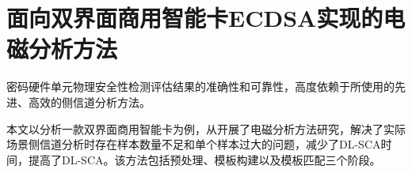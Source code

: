 \chapter{面向双界面商用智能卡ECDSA实现的电磁分析方法}\label{chap:search2}{
	密码硬件单元物理安全性检测评估结果的准确性和可靠性，高度依赖于所使用的先进、高效的侧信道分析方法。%
	
	
	
		
	本文以分析一款双界面商用智能卡为例，从\jiaodu 开展了电磁分析方法研究，解决了实际场景侧信道分析时存在样本数量不足和单个样本过大的问题，减少了DL-SCA时间，提高了DL-SCA\zyx。该方法包括预处理、模板构建以及模板匹配三个阶段。
	
}
